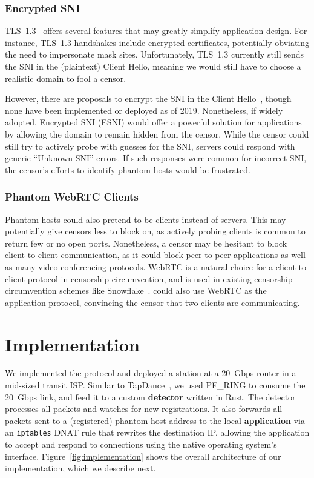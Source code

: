 \documentclass[sigconf]{acmart}
\begin{document}
\subsubsection{Encrypted SNI}
\label{esni}

TLS~1.3~\cite{tls13} offers several features that may greatly simplify 
\scheme application design. For instance, TLS~1.3 handshakes include encrypted
certificates, potentially obviating the need to impersonate mask sites.
Unfortunately, TLS~1.3 currently still sends the SNI in the (plaintext) Client
Hello, meaning we would still have to choose a realistic domain to fool a
censor.

However, there are proposals to encrypt the SNI in the Client Hello~\cite{ietf-tls-esni-02},
though none have been implemented or deployed as of 2019. Nonetheless,
if widely adopted, Encrypted SNI (ESNI) would offer a powerful solution for
\scheme applications by allowing the domain to remain hidden from the censor.
While the censor could still try to actively probe with guesses for the SNI,
servers could respond with generic ``Unknown SNI'' errors. If such responses
were common for incorrect SNI, the censor's efforts to identify phantom hosts
would be frustrated.

\subsubsection{Phantom WebRTC Clients}
\label{sec:webrtc}

Phantom hosts could also pretend to be clients instead of servers. This may
potentially give censors less to block on, as actively probing clients is common
to return few or no open ports. Nonetheless, a censor may be hesitant to block
client-to-client communication, as it could block peer-to-peer applications as
well as many video conferencing protocols. WebRTC is a
natural choice for a client-to-client protocol in censorship circumvention,
and is used in existing censorship circumvention schemes like
Snowflake~\cite{snowflake}. \scheme could also use WebRTC as the
application protocol, convincing the censor that two clients are communicating.

\section{Implementation}
\label{sec:implementation}

We implemented the \scheme protocol and deployed a station at a
20~Gbps router in a mid-sized transit ISP. Similar to TapDance~\cite{tapdance14}, we used PF\_RING to
consume the 20~Gbps link, and feed it to a custom \textbf{detector} written in Rust. The
detector processes all packets and watches for new registrations. It also
forwards all packets sent to a (registered) phantom host address to the local
\textbf{application} via an \texttt{iptables} DNAT rule that rewrites the destination IP,
allowing the application to accept and respond to connections using the native
operating system's interface. Figure~\ref{fig:implementation} shows the overall
architecture of our implementation, which we describe next.
\end{document}

